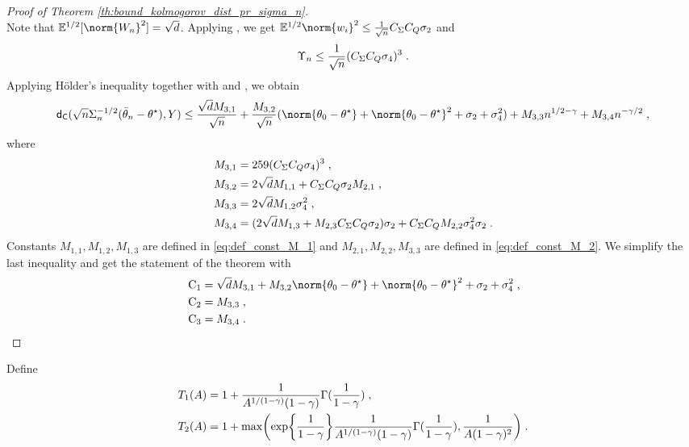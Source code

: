 \begin{proof}[Proof of Theorem \ref{th:bound_kolmogorov_dist_pr_sigma_n}]
\begin{equation}
\end{equation}
Note that $\PE^{1/2}[\norm{W_n}^2]=\sqrt{d}$. Applying ,  we get $\PE^{1/2}\norm{w_i}^2\leq \frac{1}{\sqrt{n}}C_{\Sigma}C_Q\sigma_2$  and 
$$
\Upsilon_n \leq \frac{1}{\sqrt{n}}(C_{\Sigma}C_Q\sigma_4)^3 \;.
$$
Applying H\"{o}lder's inequality together with  and , we obtain
\begin{equation}
\kolmogorov(\sqrt{n} \Sigma_{n}^{-1/2}(\bar\theta_n -\thetas), Y) \leq \frac{\sqrt{d}M_{3,1}}{\sqrt{n}} + \frac{M_{3,2}}{\sqrt{n}}(\norm{\theta_0-\thetas}+\norm{\theta_0-\thetas}^2+\sigma_2+ \sigma_4^2) + M_{3,3}n^{1/2-\gamma}+M_{3,4}n^{-\gamma/2}\eqsp,
\end{equation}
     where 
    \begin{equation}
    \begin{split}
        &M_{3,1} =259(C_{\Sigma}C_Q\sigma_4)^3\;,\\
        &M_{3,2} = 2\sqrt{d}M_{1,1}  + C_{\Sigma}C_Q\sigma_2M_{2,1}\;,\\
        &M_{3,3} = 2\sqrt{d}M_{1,2}\sigma_4^2\;,\\
        &M_{3, 4} = (2\sqrt{d}M_{1,3}+M_{2,3}C_{\Sigma}C_Q\sigma_2)\sigma_2 + C_{\Sigma}C_QM_{2,2}\sigma_4^2\sigma_2\;.
    \end{split}
    \end{equation}
    Constants $M_{1,1}, M_{1,2}, M_{1,3}$ are defined in \eqref{eq:def_const_M_1} and $M_{2,1}, M_{2,2}, M_{3,3}$ are defined in \eqref{eq:def_const_M_2}.
    We simplify the last inequality and get the statement of the theorem with
\begin{equation}
\label{eq:def_Const_M_3_i}
    \begin{split}
        &\ConstC_{1} = \sqrt{d} M_{3,1} + M_{3,2} \norm{\theta_0-\thetas}+\norm{\theta_0-\thetas}^2+\sigma_2+ \sigma_4^2 \eqsp,\\
        &\ConstC_{2} = M_{3,3}\eqsp,\\
        &\ConstC_{3} = M_{3,4}\eqsp.
    \end{split}
    \end{equation}   
\end{proof}


Define 
\begin{equation}
\label{def:const_T_1_T_2}
\begin{split}
     &T_1(A) = 1 + \frac{1}{A^{1/(1-\gamma)}(1-\gamma)}\Gamma(\frac{1}{1-\gamma})\;,\\
      &T_2(A) = 1 + \max\biggl(\exp\biggl\{\frac{1}{1-\gamma}\biggr\}\frac{1}{A^{1/(1-\gamma)}(1-\gamma)}\Gamma(\frac{1}{1-\gamma}), \frac{1}{A(1-\gamma)^2}\biggr)\;.
\end{split}
\end{equation}

